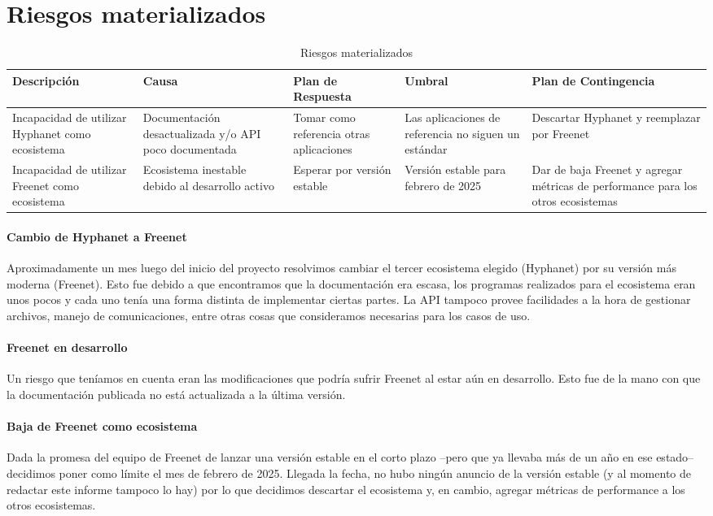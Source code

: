 \section{Riesgos materializados}

\setlength\tabcolsep{3pt}
\begin{table}[!htbp]
    \centering
    \begin{tabular}{*{5}{|p{80pt}}|}
    \hline
    \textbf{Descripción} & \textbf{Causa} & \textbf{Plan \break de \break Respuesta} & \textbf{Umbral} & \textbf{Plan \break de \break Contingencia} \\
    \hline\hline
    Incapacidad de utilizar Hyphanet como ecosistema & Documentación desactualizada y/o API poco documentada & Tomar como referencia otras aplicaciones & Las aplicaciones de referencia no siguen un estándar & Descartar Hyphanet y reemplazar por Freenet \\
    \hline
    Incapacidad de utilizar Freenet como ecosistema & Ecosistema inestable debido al desarrollo activo & Esperar por versión estable & Versión estable para febrero de 2025 & Dar de baja Freenet y agregar métricas de performance para los otros ecosistemas \\
    \hline
    \end{tabular}
    \caption{Riesgos materializados}
\end{table}

\paragraph{Cambio de Hyphanet a Freenet}
Aproximadamente un mes luego del inicio del proyecto resolvimos cambiar el tercer ecosistema elegido (Hyphanet) por su versión más moderna (Freenet). Esto fue debido a que encontramos que la documentación era escasa, los programas realizados para el ecosistema eran unos pocos y cada uno tenía una forma distinta de implementar ciertas partes. La API tampoco provee facilidades a la hora de gestionar archivos, manejo de comunicaciones, entre otras cosas que consideramos necesarias para los casos de uso.

\paragraph{Freenet en desarrollo}
Un riesgo que teníamos en cuenta eran las modificaciones que podría sufrir Freenet al estar aún en desarrollo. Esto fue de la mano con que la documentación publicada no está actualizada a la última versión.

\paragraph{Baja de Freenet como ecosistema}
Dada la promesa del equipo de Freenet de lanzar una versión estable en el corto plazo --pero que ya llevaba más de un año en ese estado-- decidimos poner como límite el mes de febrero de 2025. Llegada la fecha, no hubo ningún anuncio de la versión estable (y al momento de redactar este informe tampoco lo hay) por lo que decidimos descartar el ecosistema y, en cambio, agregar métricas de performance a los otros ecosistemas.